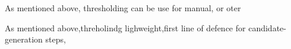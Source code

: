 
As mentioned above, thresholding can be use for manual, or oter



%
As mentioned above,threholindg lighweight,first line of defence for candidate-generation steps,


%

